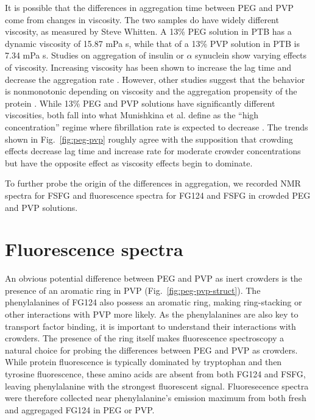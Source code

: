 It is possible that the differences in aggregation time between PEG and PVP come from changes in viscosity.  The two samples do have widely different viscosity, as measured by Steve Whitten.  A 13\% PEG solution in PTB has a dynamic viscosity of 15.87 mPa s, while that of a 13\% PVP solution in PTB is 7.34 mPa s.  Studies on aggregation of insulin or $\alpha$ synuclein show varying effects of viscosity.  Increasing viscosity has been shown to increase the lag time and decrease the aggregation rate \cite{saha16,sleutel12}.  However, other studies suggest that the behavior is nonmonotonic depending on viscosity and the aggregation propensity of the protein \cite{munishkina04, magno10}.  While 13\% PEG and PVP solutions have significantly different viscosities, both fall into what Munishkina et al. define as the ``high concentration'' regime where fibrillation rate is expected to decrease \cite{munishkina04}.  The trends shown in Fig.~\ref{fig:peg-pvp} roughly agree with the supposition that crowding effects decrease lag time and increase rate for moderate crowder concentrations but have the opposite effect as viscosity effects begin to dominate.

To further probe the origin of the differences in aggregation, we recorded NMR spectra for FSFG and fluorescence spectra for FG124 and FSFG in crowded PEG and PVP solutions.

\section{Fluorescence spectra}

An obvious potential difference between PEG and PVP as inert crowders is the presence of an aromatic ring in PVP (Fig.~\ref{fig:peg-pvp-struct}).  The phenylalanines of FG124 also possess an aromatic ring, making ring-stacking or other interactions with PVP more likely.  As the phenylalanines are also key to transport factor binding, it is important to understand their interactions with crowders.  The presence of the ring itself makes fluorescence spectroscopy a natural choice for probing the differences between PEG and PVP as crowders.  While protein fluorescence is typically dominated by tryptophan and then tyrosine fluorescence, these amino acids are absent from both FG124 and FSFG, leaving phenylalanine with the strongest fluorescent signal.  Fluoresecence spectra were therefore collected near phenylalanine's emission maximum from both fresh and aggregaged FG124 in PEG or PVP.

